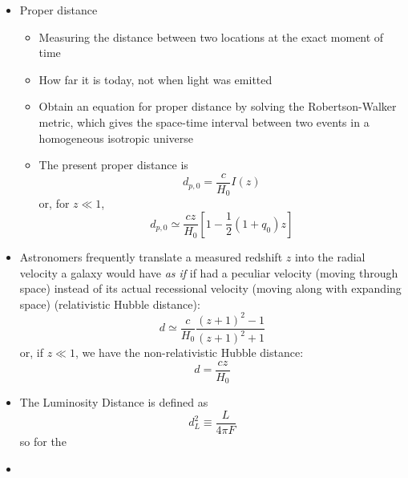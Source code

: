 \documentclass{book}
\begin{document}
\begin{itemize}
    \item Proper distance
          \begin{itemize}
              \item Measuring the distance between two locations at the exact moment of time
              \item How far it is today, not when light was emitted
              \item Obtain an equation for proper distance by solving the Robertson-Walker metric, which gives the space-time interval between two events in a homogeneous isotropic universe
              \item The present proper distance is
                    \begin{equation*}
                        d_{p,0} = \frac{c}{H_0} I(z) \tag{C\&O 29.169}
                    \end{equation*}
                    or, for $z \ll 1$,
                    \begin{equation*}
                        d_{p,0} \simeq \frac{c z}{H_0} \left[ 1 - \frac{1}{2} (1 + q_0) z \right] \tag{C\&O 29.181}
                    \end{equation*}
          \end{itemize}
    \item Astronomers frequently translate a measured redshift $z$ into the radial velocity a galaxy would have \emph{as if} if had a peculiar velocity (moving through space) instead of its actual recessional velocity (moving along with expanding space) (relativistic Hubble distance):
          \begin{equation*}
              d \simeq \frac{c}{H_0} \frac{(z+1)^2 - 1}{(z+1)^2 + 1} \tag{C\&O 27.7}
          \end{equation*}
          or, if $z \ll 1$, we have the non-relativistic Hubble distance:
          \begin{equation*}
              d = \frac{c z}{H_0}
          \end{equation*}
    \item The Luminosity Distance is defined as
          \begin{equation*}
              d_L^2 \equiv \frac{L}{4 \pi F} \tag{C\&O 29.182}
          \end{equation*}
          so for the 
    \item
\end{itemize}

\backmatter
\end{document}
